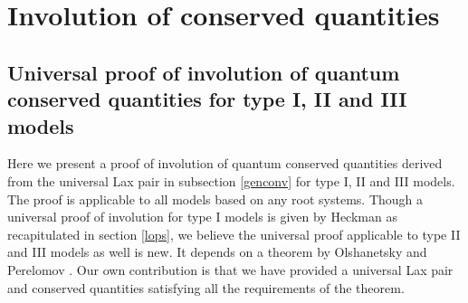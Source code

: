 \documentclass[a4paper,12pt]{article}
\begin{document}
\section{Involution of conserved quantities}
\label{invopr}
\setcounter{equation}{0}

\subsection{Universal proof of involution of quantum conserved quantities
for
type I, II and III models}
\label{uniproof}
Here we present a proof of involution of quantum conserved quantities
\coordHE{}
derived from the universal Lax pair in subsection \ref{genconv}
for type I, II and III models.
The proof is applicable to all models based on any root systems.
Though a universal proof of involution for type I models is given by Heckman
\cite{Heck2} as recapitulated in section \ref{lops}, we believe the
universal
proof applicable to type II and III models as well is new.
It depends on a theorem by Olshanetsky and Perelomov \cite{OP3}.
Our own contribution is that we have provided a universal
Lax pair and conserved
quantities satisfying all the requirements of the theorem.
\end{document}
